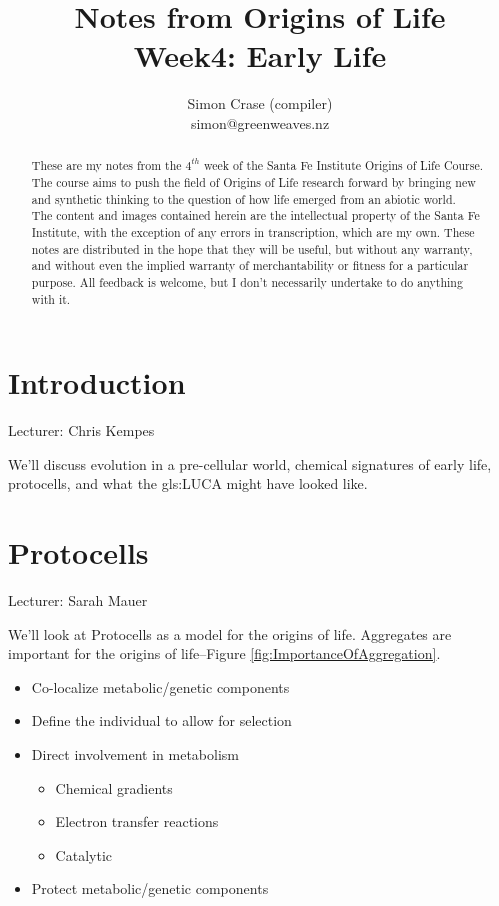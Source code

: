 \documentclass[]{article}
\title{Notes from Origins of Life\\Week4: Early Life}
\author{Simon Crase (compiler)\\simon@greenweaves.nz}
\begin{document}
\maketitle

\begin{abstract}
   These are my notes from the $4^{th}$ week of the Santa Fe Institute Origins of Life Course\cite{sfi2020}. The course aims to push the field of Origins of Life research forward by bringing new and synthetic thinking to the question of how life emerged from an abiotic world.\\
   The content and images contained herein are the intellectual property of the Santa Fe Institute, with the exception of any errors in transcription, which are my own.
   These notes are distributed in the hope that they will be useful,
   but without any warranty, and without even the implied warranty of
   merchantability or fitness for a particular purpose. All feedback is welcome,
   but I don't necessarily undertake to do anything with it.
\end{abstract}

\setcounter{tocdepth}{2}
\tableofcontents
\listoffigures
\section{Introduction}

Lecturer: Chris Kempes


We'll discuss evolution in a pre-cellular world, chemical signatures of early life, protocells, and what the \gls{gls:LUCA} might have looked like.

\section{Protocells}

Lecturer: Sarah Mauer

We'll look at Protocells as a model for the origins of life. Aggregates are important for the origins of life--Figure \ref{fig:ImportanceOfAggregation}.

\begin{itemize}
	\item  Co-localize metabolic/genetic components
	\item   Define the individual to allow for 	selection
	\item   Direct involvement in metabolism
	\begin{itemize}
		\item 	Chemical gradients
		\item   Electron transfer reactions
		\item   Catalytic
	\end{itemize}
	\item   Protect metabolic/genetic 	components
\end{itemize}
\end{document}
